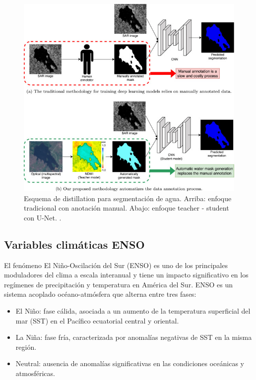 \begin{figure}[H]
  \centering
  \includegraphics[scale=0.7]{Figures/KD_deepaqua.jpg}
  \caption{Esquema de distillation para segmentación de agua. Arriba: enfoque tradicional con anotación manual. Abajo: enfoque teacher - student con U-Net. \protect\footnotemark.}
  \label{fig:kd-water}
\end{figure}



\subsection*{Variables climáticas ENSO}

El fenómeno El Niño-Oscilación del Sur (ENSO) es uno de los principales moduladores del clima a escala interanual y tiene un impacto significativo en los regímenes de precipitación y temperatura en América del Sur. ENSO es un sistema acoplado océano-atmósfera que alterna entre tres fases:

\begin{itemize}
    \item El Niño: fase cálida, asociada a un aumento de la temperatura superficial del mar (SST) en el Pacífico ecuatorial central y oriental.
    \item La Niña: fase fría, caracterizada por anomalías negativas de SST en la misma región.
    \item Neutral: ausencia de anomalías significativas en las condiciones oceánicas y atmosféricas.
\end{itemize}

